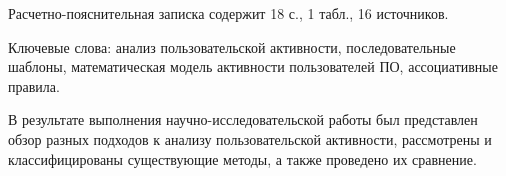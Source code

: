 
Расчетно-пояснительная записка содержит 18 с., 1 табл., 16 источников.

Ключевые слова: анализ пользовательской активности, последовательные шаблоны, математическая модель активности пользователей ПО, ассоциативные правила.


%

В результате выполнения научно-исследовательской работы был представлен обзор разных подходов к анализу пользовательской активности, рассмотрены и классифицированы существующие методы, а также проведено их сравнение.

%
%
%

